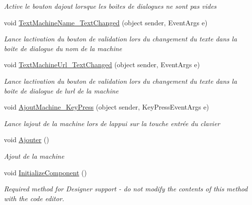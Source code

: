 \begin{DoxyCompactItemize}
\begin{DoxyCompactList}\small\item\em Active le bouton d\textquotesingle{}ajout lorsque les boites de dialogues ne sont pas vides \end{DoxyCompactList}\item 
void \mbox{\hyperlink{class_m_t_connect_agent_1_1_form_ajout_machine_a12860f897c6b23d62f0b09db92626583}{Text\+Machine\+Name\+\_\+\+Text\+Changed}} (object sender, Event\+Args e)
\begin{DoxyCompactList}\small\item\em Lance l\textquotesingle{}activation du bouton de validation lors du changement du texte dans la boite de dialogue du nom de la machine \end{DoxyCompactList}\item 
void \mbox{\hyperlink{class_m_t_connect_agent_1_1_form_ajout_machine_acfa9fdb3189331da1245fef3e23f8ed4}{Text\+Machine\+Url\+\_\+\+Text\+Changed}} (object sender, Event\+Args e)
\begin{DoxyCompactList}\small\item\em Lance l\textquotesingle{}activation du bouton de validation lors du changement du texte dans la boite de dialogue de l\textquotesingle{}url de la machine \end{DoxyCompactList}\item 
void \mbox{\hyperlink{class_m_t_connect_agent_1_1_form_ajout_machine_a8040ed6042861e356694de42ffc48653}{Ajout\+Machine\+\_\+\+Key\+Press}} (object sender, Key\+Press\+Event\+Args e)
\begin{DoxyCompactList}\small\item\em Lance l\textquotesingle{}ajout de la machine lors de l\textquotesingle{}appui sur la touche entrée du clavier \end{DoxyCompactList}\item 
void \mbox{\hyperlink{class_m_t_connect_agent_1_1_form_ajout_machine_a43fb917c218c43331ae32f2e056f9b46}{Ajouter}} ()
\begin{DoxyCompactList}\small\item\em Ajout de la machine \end{DoxyCompactList}\item 
void \mbox{\hyperlink{class_m_t_connect_agent_1_1_form_ajout_machine_a936b4b500ded91215c0ed272b98b94be}{Initialize\+Component}} ()
\begin{DoxyCompactList}\small\item\em Required method for Designer support -\/ do not modify the contents of this method with the code editor. \end{DoxyCompactList}\end{DoxyCompactItemize}
